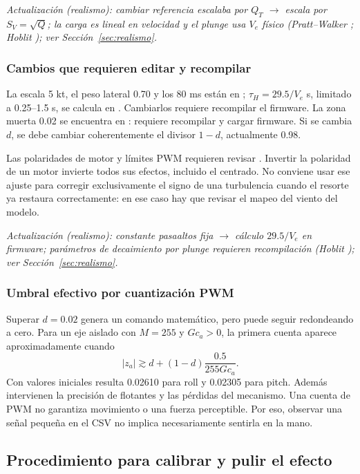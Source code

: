 \textit{Actualización (realismo): cambiar referencia escalaba por $Q_T$ $\rightarrow$ escala por $S_V=\sqrt Q$; la carga es lineal en velocidad y el plunge usa $V_e$ físico (Pratt--Walker \cite{pratt1954}; Hoblit \cite{hoblit1988}); ver Sección~\ref{sec:realismo}.}

\subsubsection{Cambios que requieren editar y recompilar}
La escala 5 kt, el peso lateral 0.70 y los 80 ms están en ; $\tau_H=29.5/V_e$ s, limitado a 0.25--1.5 s, se calcula en . Cambiarlos requiere recompilar el firmware. La zona muerta 0.02 se encuentra en : requiere recompilar y cargar firmware. Si se cambia $d$, se debe cambiar coherentemente el divisor $1-d$, actualmente 0.98.

Las polaridades de motor y límites PWM requieren revisar . Invertir la polaridad de un motor invierte todos sus efectos, incluido el centrado. No conviene usar ese ajuste para corregir exclusivamente el signo de una turbulencia cuando el resorte ya restaura correctamente: en ese caso hay que revisar el mapeo del viento del modelo.

\textit{Actualización (realismo): constante pasaaltos fija $\rightarrow$ cálculo $29.5/V_e$ en firmware; parámetros de decaimiento por plunge requieren recompilación (Hoblit \cite{hoblit1988}); ver Sección~\ref{sec:realismo}.}

\subsubsection{Umbral efectivo por cuantización PWM}
Superar $d=0.02$ genera un comando matemático, pero puede seguir redondeando a cero. Para un eje aislado con $M=255$ y $Gc_a>0$, la primera cuenta aparece aproximadamente cuando
\begin{equation}
|z_a|\gtrsim d+(1-d)\frac{0.5}{255Gc_a}.
\end{equation}
Con valores iniciales resulta 0.02610 para roll y 0.02305 para pitch. Además intervienen la precisión de flotantes y las pérdidas del mecanismo. Una cuenta de PWM no garantiza movimiento o una fuerza perceptible. Por eso, observar una señal pequeña en el CSV no implica necesariamente sentirla en la mano.

\subsection{Procedimiento para calibrar y pulir el efecto}
